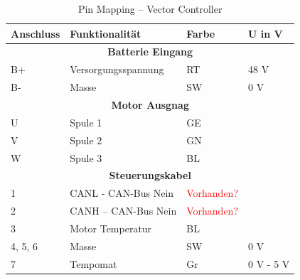 \begin{table}[!ht]
	\centering
	\caption{Pin Mapping – Vector Controller}
	\label{Vector_Controller:tab:pinmapping}
	\begin{tabular}{lll|l}
		\hline
		\textbf{Anschluss}           & \textbf{Funktionalität}  & \textbf{Farbe}              & \textbf{U in V}                  \\ \hline
		\multicolumn{4}{c}{\textbf{Batterie Eingang}}                                                                            \\ \hline
		\multicolumn{1}{l|}{B+}      & Versorgungsspannung      & RT                          & 48 V                             \\
		\multicolumn{1}{l|}{B-}      & Masse                    & SW                          & 0 V                              \\ \hline
		\multicolumn{4}{c}{\textbf{Motor Ausgnag}}                                                                               \\ \hline
		\multicolumn{1}{l|}{U}       & Spule 1                  & GE                          &                                  \\
		\multicolumn{1}{l|}{V}       & Spule 2                  & GN                          &                                  \\
		\multicolumn{1}{l|}{W}       & Spule 3                  & BL                          &                                  \\ \hline
		\multicolumn{4}{c}{\textbf{Steuerungskabel}}                                                                             \\ \hline
		\multicolumn{1}{l|}{1}       & CANL - CAN-Bus Nein           & \textcolor{red}{Vorhanden?} &                                  \\
		\multicolumn{1}{l|}{2}       & CANH – CAN-Bus Nein           & \textcolor{red}{Vorhanden?} &                                  \\
		\multicolumn{1}{l|}{3}       & Motor Temperatur         & BL                          &                                  \\
		\multicolumn{1}{l|}{4, 5, 6} & Masse                    & SW                          & 0 V                              \\
		\multicolumn{1}{l|}{7}       & Tempomat                 & Gr                          & 0 V - 5 V                        \\

\end{tabular}
\end{table}

